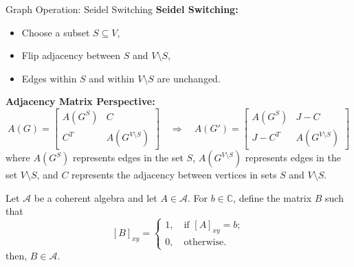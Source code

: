 \documentclass{beamer}
\begin{document}
\begin{frame}{Graph Operation: Seidel Switching}
\textbf{Seidel Switching:}
\begin{itemize}
  \item Choose a subset \( S \subseteq V \),
  \item Flip adjacency between \( S \) and \( V \setminus S \),
  \item Edges within \( S \) and within \( V \setminus S \) are unchanged.
\end{itemize}

\vspace{1em}
\textbf{Adjacency Matrix Perspective:}
\[
A(G) =
\begin{bmatrix}
A(G^S) & C \\
C^T & A(G^{V\setminus S})
\end{bmatrix}
\quad
\Rightarrow
\quad
A(G') =
\begin{bmatrix}
A(G^S) & J-C \\
J-C^T & A(G^{V\setminus S})
\end{bmatrix}
\]
where $A(G^S)$ represents edges in the set $S$, $A(G^{V\setminus S})$ represents edges in the set $V\setminus S$, and $C$ represents the adjacency between vertices in sets $S$ and $V\setminus S$.
\end{frame}

\begin{frame}
    \begin{theorem}
        Let $\mathcal{A}$ be a coherent algebra and let $A\in\mathcal{A}$. For $b\in\mathbb{C}$, define the matrix $B$ such that
        \[
        [B]_{xy}=\begin{cases}
            1,\quad \text{if } [A]_{xy}=b;\\
            0,\quad \text{otherwise}.
        \end{cases}
        \]
        then, $B\in\mathcal{A}$.
    \end{theorem}
\end{frame}
\end{document}
